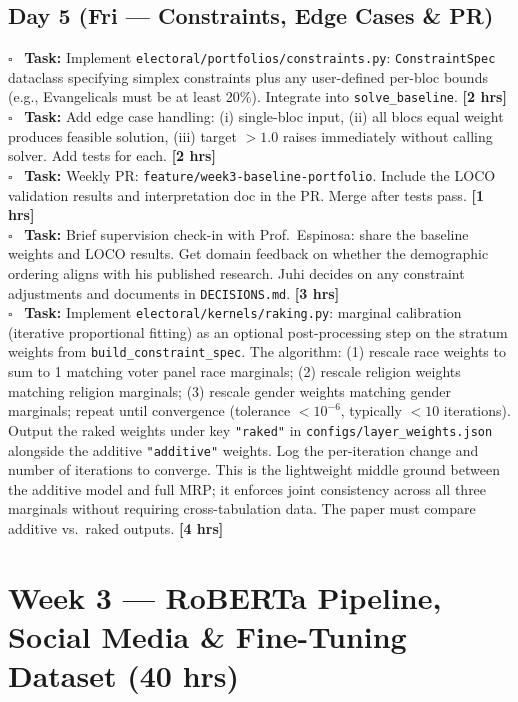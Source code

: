 \documentclass[11pt]{article}
\newcommand{\hrs}[1]{\textbf{[#1 hrs]}}
\newcommand{\dayhead}[2]{%
  \subsection*{Day #1 \normalfont\small\color{codegray}(#2)}}
\newcommand{\task}[2]{%
  \noindent\textbf{Task:} #1 \hfill \hrs{#2}\\}
\newcommand{\done}{\textcolor{sectionblue}{$\square$}\ }
\begin{document}
\dayhead{5}{Fri --- Constraints, Edge Cases \& PR}

\begin{taskbox}
\done \task{Implement \texttt{electoral/portfolios/constraints.py}:
  \texttt{ConstraintSpec} dataclass specifying simplex constraints plus
  any user-defined per-bloc bounds (e.g., Evangelicals must be at least 20\%).
  Integrate into \texttt{solve\_baseline}.}{2}

\done \task{Add edge case handling: (i) single-bloc input, (ii) all blocs
  equal weight produces feasible solution, (iii) target $> 1.0$ raises
  immediately without calling solver. Add tests for each.}{2}

\done \task{Weekly PR: \texttt{feature/week3-baseline-portfolio}. Include the
  LOCO validation results and interpretation doc in the PR. Merge after
  tests pass.}{1}

\done \task{Brief supervision check-in with Prof.\ Espinosa: share the baseline
  weights and LOCO results. Get domain feedback on whether the demographic
  ordering aligns with his published research. Juhi decides on any
  constraint adjustments and documents in \texttt{DECISIONS.md}.}{3}

\done \task{Implement \texttt{electoral/kernels/raking.py}: marginal calibration
  (iterative proportional fitting) as an optional post-processing step on the
  stratum weights from \texttt{build\_constraint\_spec}. The algorithm:
  (1) rescale race weights to sum to 1 matching voter panel race marginals;
  (2) rescale religion weights matching religion marginals;
  (3) rescale gender weights matching gender marginals;
  repeat until convergence (tolerance $< 10^{-6}$, typically $< 10$ iterations).
  Output the raked weights under key \texttt{"raked"} in
  \texttt{configs/layer\_weights.json} alongside the additive \texttt{"additive"}
  weights. Log the per-iteration change and number of iterations to converge.
  This is the lightweight middle ground between the additive model and full MRP;
  it enforces joint consistency across all three marginals without requiring
  cross-tabulation data. The paper must compare additive vs.\ raked outputs.}{4}
\end{taskbox}

\newpage

\section{Week 3 --- RoBERTa Pipeline, Social Media \& Fine-Tuning Dataset (40 hrs)}
\end{document}
